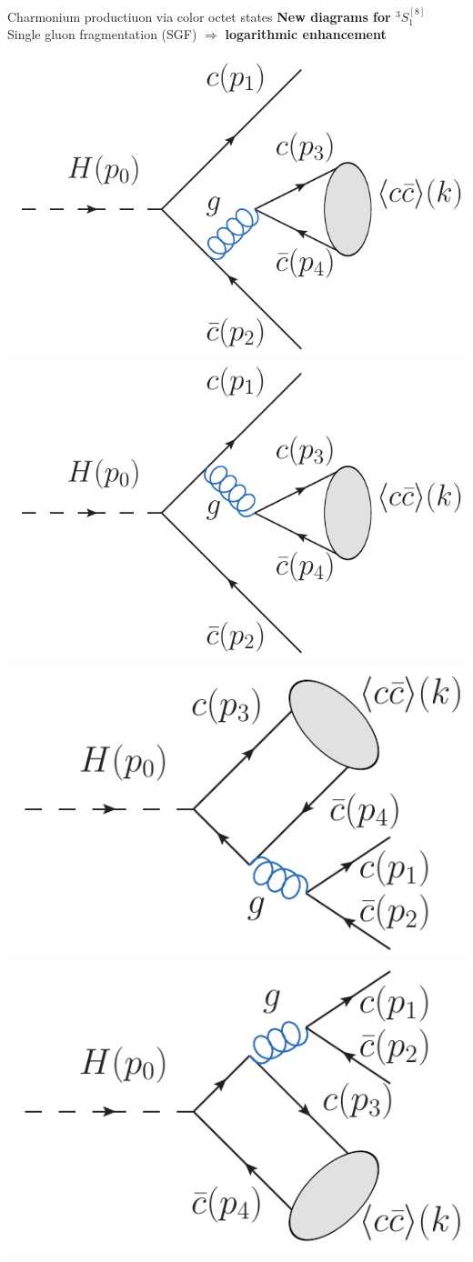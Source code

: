 \documentclass[aspectratio=169]{beamer}
\begin{document}
\begin{frame}{Charmonium productiuon via color octet states}
	\hspace{3mm}\textcolor{PittRoyal}{\bf New diagrams for $^3S_1^{[8]}$}\\
	\hspace{5mm}Single gluon fragmentation (SGF)  $\Rightarrow$ {\bf logarithmic enhancement}
	\begin{center}
		\includegraphics[width=.22\textwidth]{figs/Feynman_hcc_CO_QCD1.pdf}
		\includegraphics[width=.22\textwidth]{figs/Feynman_hcc_CO_QCD2.pdf}
		\includegraphics[width=.22\textwidth]{figs/Feynman_hcc_CO_QCD3.pdf}
		\includegraphics[width=.22\textwidth]{figs/Feynman_hcc_CO_QCD4.pdf}
	\end{center}
\end{frame}
\end{document}
